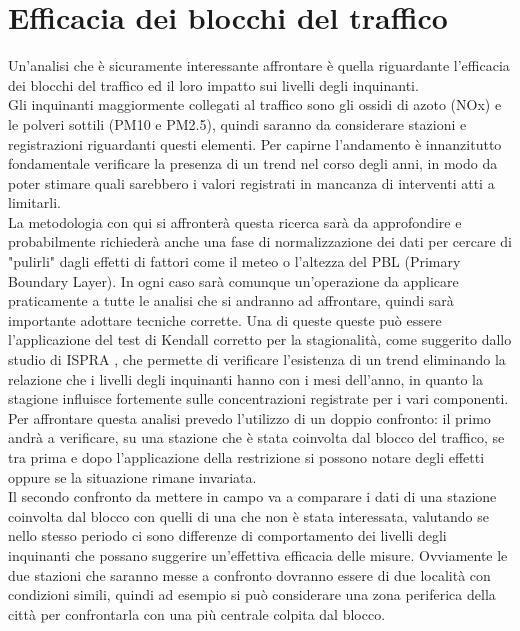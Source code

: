 \documentclass{article}
\begin{document}
\section{Efficacia dei blocchi del traffico}
Un'analisi che è sicuramente interessante affrontare è quella riguardante l'efficacia dei blocchi del traffico ed il loro impatto sui livelli degli inquinanti. 
\\Gli inquinanti maggiormente collegati al traffico sono gli ossidi di azoto (NOx) e le polveri sottili (PM10 e PM2.5), quindi saranno da considerare stazioni e registrazioni riguardanti questi elementi.
Per capirne l'andamento è innanzitutto fondamentale verificare la presenza di un trend nel corso degli anni, in modo da poter stimare quali sarebbero i valori registrati in mancanza di interventi atti a limitarli. 
\\La metodologia con qui si affronterà questa ricerca sarà da approfondire e probabilmente richiederà anche una fase di normalizzazione dei dati per cercare di "pulirli" dagli effetti di fattori come il meteo o l'altezza del PBL (Primary Boundary Layer). In ogni caso sarà comunque un'operazione da applicare praticamente a tutte le analisi che si andranno ad affrontare, quindi sarà importante adottare tecniche corrette. Una di queste queste può essere l'applicazione del test di Kendall corretto per la stagionalità, come suggerito dallo studio di ISPRA \cite{cattani2014analisi}, che permette di verificare l'esistenza di un trend eliminando la relazione che i livelli degli inquinanti hanno con i mesi dell'anno, in quanto la stagione influisce fortemente sulle concentrazioni registrate per i vari componenti.  
\\Per affrontare questa analisi prevedo l'utilizzo di un doppio confronto: il primo andrà a verificare, su una stazione che è stata coinvolta dal blocco del traffico, se tra prima e dopo l'applicazione della restrizione si possono notare degli effetti oppure se la situazione rimane invariata.
\\Il secondo confronto da mettere in campo va a comparare i dati di una stazione coinvolta dal blocco con quelli di una che non è stata interessata, valutando se nello stesso periodo ci sono differenze di comportamento dei livelli degli inquinanti che possano suggerire un'effettiva efficacia delle misure. Ovviamente le due stazioni che saranno messe a confronto dovranno essere di due località con condizioni simili, quindi ad esempio si può considerare una zona periferica della città per confrontarla con una più centrale colpita dal blocco. 
\end{document}
